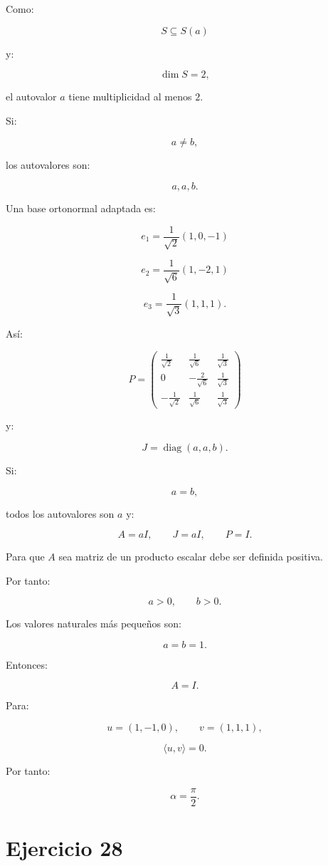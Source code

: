 \documentclass[11pt,a4paper]{article}
\newcommand{\diag}{\operatorname{diag}}
\begin{document}
Como:

\[
S\subseteq S(a)
\]

y:

\[
\dim S=2,
\]

el autovalor $a$ tiene multiplicidad al menos $2$.

Si:

\[
a\neq b,
\]

los autovalores son:

\[
a,a,b.
\]

Una base ortonormal adaptada es:

\[
e_1=
\frac1{\sqrt2}(1,0,-1)
\]

\[
e_2=
\frac1{\sqrt6}(1,-2,1)
\]

\[
e_3=
\frac1{\sqrt3}(1,1,1).
\]

Así:

\[
\boxed{
P=
\begin{pmatrix}
\frac1{\sqrt2}&\frac1{\sqrt6}&\frac1{\sqrt3}\\
0&-\frac2{\sqrt6}&\frac1{\sqrt3}\\
-\frac1{\sqrt2}&\frac1{\sqrt6}&\frac1{\sqrt3}
\end{pmatrix}
}
\]

y:

\[
\boxed{
J=
\diag(a,a,b).
}
\]

Si:

\[
a=b,
\]

todos los autovalores son $a$ y:

\[
\boxed{
A=aI,
\qquad
J=aI,
\qquad
P=I.
}
\]

Para que $A$ sea matriz de un producto escalar debe ser definida positiva.

Por tanto:

\[
\boxed{
a>0,
\qquad
b>0.
}
\]

Los valores naturales más pequeños son:

\[
a=b=1.
\]

Entonces:

\[
A=I.
\]

Para:

\[
u=(1,-1,0),
\qquad
v=(1,1,1),
\]

\[
\langle u,v\rangle=0.
\]

Por tanto:

\[
\boxed{
\alpha=\frac{\pi}{2}.
}
\]

\section{Ejercicio 28}
\end{document}
